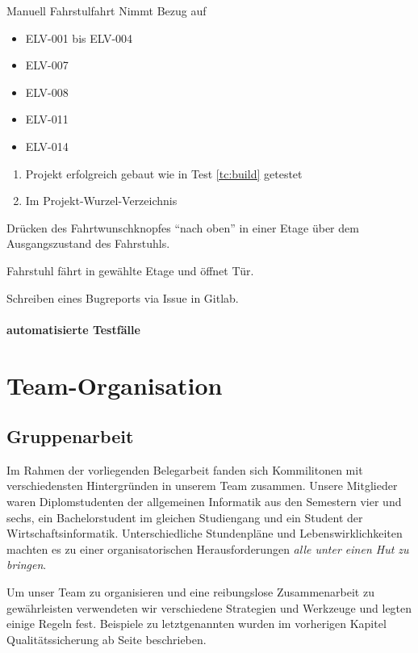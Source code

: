 \begin{testcase}{Manuell}
\tcSubject Fahrstulfahrt
\tcRemark Nimmt Bezug auf
	\begin{itemize}
	\item ELV-001 bis ELV-004
	\item ELV-007
	\item ELV-008
	\item ELV-011
	\item ELV-014
	\end{itemize}
\tcConditions
	\begin{enumerate}
	\item Projekt erfolgreich gebaut wie in Test \ref{tc:build} getestet
	\item Im Projekt-Wurzel-Verzeichnis
	\end{enumerate}
\tcProceeding Drücken des Fahrtwunschknopfes "`nach oben"' in einer Etage über dem Ausgangszustand des Fahrstuhls.

\tcGoal Fahrstuhl fährt in gewählte Etage und öffnet Tür.

\tcError Schreiben eines Bugreports via Issue in Gitlab.
\end{testcase}

\subsubsection{automatisierte Testfälle}

\chapter{Team-Organisation}
\section{Gruppenarbeit}
Im Rahmen der vorliegenden Belegarbeit fanden sich Kommilitonen mit verschiedensten Hintergründen in unserem Team zusammen. Unsere Mitglieder waren Diplomstudenten der allgemeinen Informatik aus den Semestern vier und sechs, ein Bachelorstudent im gleichen Studiengang und ein Student der Wirtschaftsinformatik. Unterschiedliche Stundenpläne und Lebenswirklichkeiten machten es zu einer organisatorischen Herausforderungen \glqq \textit{alle unter einen Hut zu bringen}\grqq.

Um unser Team zu organisieren und eine reibungslose Zusammenarbeit zu gewährleisten verwendeten wir verschiedene Strategien und Werkzeuge und legten einige Regeln fest. Beispiele zu letztgenannten wurden im vorherigen Kapitel Qualitätssicherung ab Seite \pageref{QS} beschrieben.


